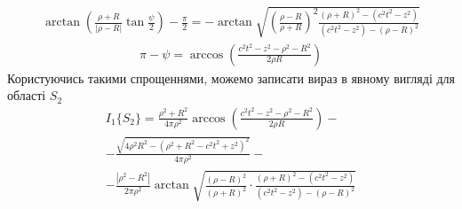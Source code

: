 %
%
%
\begin{equation*} \begin{aligned}
\arctan \left( \frac{\rho + R}{ |\rho - R| } \tan \frac{\psi}{2} \right) - 
\frac{\pi}{2} = - \arctan \sqrt{ \left( \frac{\rho - R}{\rho + R} \right)^2
\frac{\left( \rho + R \right)^2 - \left( c^2t^2 - z^2 \right)} 
{\left( c^2t^2 - z^2 \right) - \left( \rho - R \right)^2} }
\end{aligned} \end{equation*}
%
\begin{equation*} \begin{aligned}
\pi - \psi = \arccos \left( \frac{c^2 t^2 - z^2 - \rho^2 - R^2}{2 \rho R} \right)
\end{aligned} \end{equation*}
%
Користуючись такими спрощеннями, можемо записати вираз в явному вигляді для 
області $ S_2 $
%
\begin{equation*} \begin{aligned}
I_1 \{ S_2 \} = \frac{\rho^2 + R^2}{4 \pi \rho^2} \arccos 
\left( \frac{c^2 t^2 - z^2 - \rho^2 - R^2}{2 \rho R} \right) - \\
- \frac{\sqrt{4 \rho^2 R^2 - (\rho^2 + R^2 - c^2t^2 + z^2)^2}}{4 \pi \rho^2} - \\
- \frac{ |\rho^2 - R^2| }{2 \pi \rho^2} 
\arctan \sqrt{ \frac{(\rho - R)^2}{(\rho + R)^2} \cdot
\frac{\left( \rho + R \right)^2 - \left( c^2t^2 - z^2 \right)} 
{\left( c^2t^2 - z^2 \right) - \left( \rho - R \right)^2} }
\end{aligned} \end{equation*}

